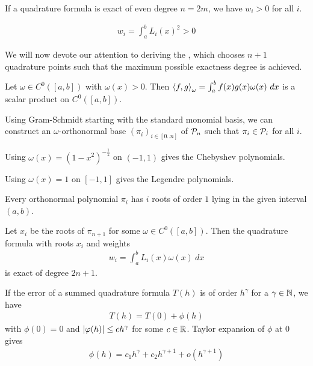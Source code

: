 \begin{lemma}
	If a quadrature formula is exact of even degree $n = 2m$, we have $w_i > 0$ for all $i$.
\end{lemma}
\begin{proofsketch}
	\begin{align*}
		w_i = \int_a^b L_i(x)^2 > 0
	\end{align*}
\end{proofsketch}

We will now devote our attention to deriving the , which chooses $n+1$ quadrature points such that the maximum possible exactness degree is achieved.
\begin{proposition}
	Let $\omega \in C^0([a,b])$ with $\omega(x) > 0$. Then $\left\langle f, g \right\rangle_\omega = \int_a^b f(x) g(x) \omega(x) ~dx$ is a scalar product on $C^0([a,b])$.
\end{proposition}
Using Gram-Schmidt starting with the standard monomial basis, we can construct an $\omega$-orthonormal base $(\pi_i)_{i \in [0..n]}$ of $\mathcal{P}_n$ such that $\pi_i \in \mathcal{P}_i$ for all $i$.
\begin{proposition}
	Using $\omega(x) = (1-x^2)^{-\frac{1}{2}}$ on $(-1,1)$ gives the Chebyshev polynomials.
\end{proposition} 
\begin{proposition}
	Using $\omega(x) = 1$ on $[-1,1]$ gives the Legendre polynomials.
\end{proposition}
\begin{lemma}
	Every orthonormal polynomial $\pi_i$ has $i$ roots of order $1$ lying in the given interval $(a,b)$.
\end{lemma}
\begin{importanttheorem}{}{}
	Let $x_i$ be the roots of $\pi_{n+1}$ for some $\omega \in C^0([a,b])$. Then the quadrature formula with roots $x_i$ and weights
	\begin{align*}
		w_i = \int_a^b L_i(x)\omega(x) ~dx
	\end{align*}
	is exact of degree $2n+1$.
\end{importanttheorem}
If the error of a summed quadrature formula $T(h)$ is of order $h^\gamma$ for a $\gamma \in \mathbb{N}$, we have
\begin{align*}
	T(h) = T(0) + \phi(h)
\end{align*}
with $\phi(0) = 0$ and $\abs{\varphi(h)} \leq ch^\gamma$ for some $c \in \mathbb{R}$. Taylor expansion of $\phi$ at $0$ gives
\begin{align*}
	\phi(h) = c_1h^\gamma + c_2 h^{\gamma + 1} + o(h^{\gamma + 1})
\end{align*}
